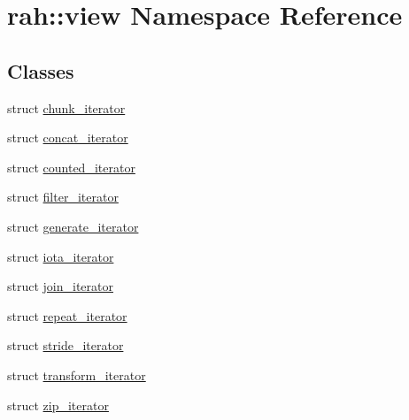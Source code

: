 \hypertarget{namespacerah_1_1view}{}\section{rah\+::view Namespace Reference}
\label{namespacerah_1_1view}
\subsection*{Classes}
\begin{DoxyCompactItemize}
\item 
struct \mbox{\hyperlink{structrah_1_1view_1_1chunk__iterator}{chunk\+\_\+iterator}}
\item 
struct \mbox{\hyperlink{structrah_1_1view_1_1concat__iterator}{concat\+\_\+iterator}}
\item 
struct \mbox{\hyperlink{structrah_1_1view_1_1counted__iterator}{counted\+\_\+iterator}}
\item 
struct \mbox{\hyperlink{structrah_1_1view_1_1filter__iterator}{filter\+\_\+iterator}}
\item 
struct \mbox{\hyperlink{structrah_1_1view_1_1generate__iterator}{generate\+\_\+iterator}}
\item 
struct \mbox{\hyperlink{structrah_1_1view_1_1iota__iterator}{iota\+\_\+iterator}}
\item 
struct \mbox{\hyperlink{structrah_1_1view_1_1join__iterator}{join\+\_\+iterator}}
\item 
struct \mbox{\hyperlink{structrah_1_1view_1_1repeat__iterator}{repeat\+\_\+iterator}}
\item 
struct \mbox{\hyperlink{structrah_1_1view_1_1stride__iterator}{stride\+\_\+iterator}}
\item 
struct \mbox{\hyperlink{structrah_1_1view_1_1transform__iterator}{transform\+\_\+iterator}}
\item 
struct \mbox{\hyperlink{structrah_1_1view_1_1zip__iterator}{zip\+\_\+iterator}}
\end{DoxyCompactItemize}
